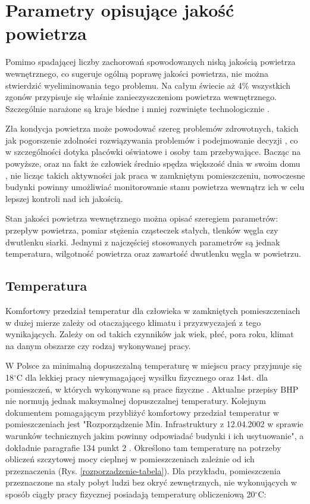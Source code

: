
\section{Parametry opisujące jakość powietrza}
\label{opis-parametrow}

Pomimo spadającej liczby zachorowań spowodowanych niską jakością powietrza 
wewnętrznego, co sugeruje ogólną poprawę jakości powietrza, nie można 
stwierdzić wyeliminowania tego problemu. Na całym świecie aż 4\% wszystkich 
zgonów przypisuje się właśnie zanieczyszczeniom powietrza wewnętrznego. 
Szczególnie narażone są kraje biedne i mniej rozwinięte technologicznie \cite{owid}.

Zła kondycja powietrza może powodować szereg  
problemów zdrowotnych, takich jak pogorszenie zdolności rozwiązywania 
problemów i podejmowanie decyzji \cite{co2-effects}, co w szczególności dotyka placówki oświatowe i 
osoby tam przebywające. Bacząc na powyższe, oraz na fakt że człowiek średnio spędza większość dnia w swoim 
domu \cite{time-indoors}, nie licząc takich aktywności jak praca w zamkniętym pomieszczeniu, nowoczesne 
budynki powinny umożliwiać monitorowanie stanu powietrza wewnątrz 
ich w celu lepszej kontroli nad ich jakością.

Stan jakości powietrza wewnętrznego można opisać szeregiem parametrów: przepływ powietrza, 
pomiar stężenia cząsteczek stałych, tlenków węgla czy dwutlenku siarki. Jednymi z 
najczęściej stosowanych parametrów są jednak temperatura, wilgotność powietrza oraz 
zawartość dwutlenku węgla w powietrzu. 

\subsection{Temperatura}

Komfortowy przedział temperatur dla człowieka w zamkniętych pomieszczeniach w dużej 
mierze zależy od otaczającego klimatu i przyzwyczajeń z tego wynikających. Zależy on od takich czynników 
jak wiek, płeć, pora roku, klimat na danym obszarze czy rodzaj wykonywanej pracy.

W Polsce za minimalną dopuszczalną temperaturę w miejscu pracy przyjmuje się 18$^{\circ}$C dla 
lekkiej pracy niewymagającej wysiłku fizycznego oraz 14st. dla pomieszczeń, w których wykonywane są prace 
fizyczne \cite{manutan-bhp}. Aktualne przepisy BHP nie normują jednak maksymalnej dopuszczalnej temperatury. 
Kolejnym dokumentem pomagającym przybliżyć komfortowy przedział temperatur w pomieszczeniach jest
"Rozporządzenie Min. Infrastruktury z 12.04.2002 w sprawie warunków technicznych jakim powinny odpowiadać 
budynki i ich usytuowanie", a dokładnie paragrafie 134 punkt 2 \cite{rozp-bud}. Określono tam temperaturę na potrzeby obliczeń szczytowej 
mocy cieplnej w pomieszczeniach zależnie od ich przeznaczenia  (Rys. \ref{rozporzadzenie-tabela}).
Dla przykładu, pomieszczenia przeznaczone na stały pobyt ludzi bez okryć zewnętrznych, nie wykonujących 
w sposób ciągły pracy fizycznej posiadają temperaturę obliczeniową 20$^{\circ}$C:

